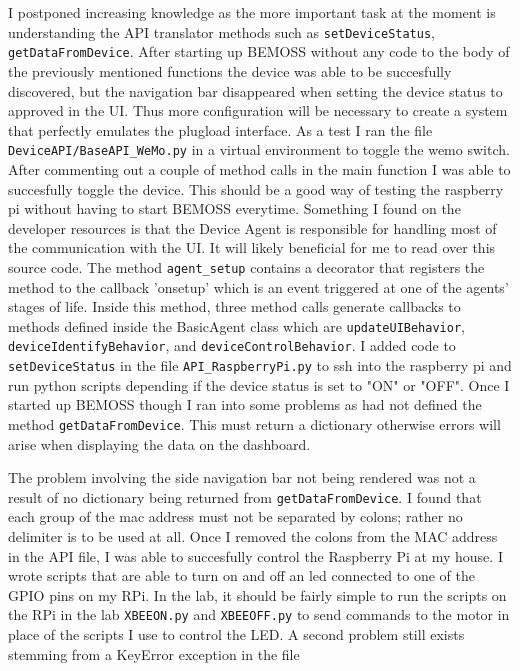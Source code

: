 \documentclass[fontsize=11pt, %
                             paper=letter, %
                             twoside, %
                             captions=tableheading,
                             index=totoc,
                             hyperref]{labbook}
\begin{document}
\begin{addmargin}[0cm]{0cm}
I postponed increasing knowledge as the more important task at the moment is understanding the API translator methods such as \texttt{setDeviceStatus}, \texttt{getDataFromDevice}. After starting up BEMOSS without any code to the body of the previously mentioned functions the device was able to be succesfully discovered, but the navigation bar disappeared when setting the device status to approved in the UI. Thus more configuration will be necessary to create a system that perfectly emulates the plugload interface.
\bigbreak\noindent
As a test I ran the file \texttt{DeviceAPI/BaseAPI\_WeMo.py} in a virtual environment to toggle the wemo switch. After commenting out a couple of method calls in the main function I was able to succesfully toggle the device. This should be a good way of testing the raspberry pi without having to start BEMOSS everytime.
\bigbreak\noindent
Something I found on the developer resources is that the Device Agent is responsible for handling most of the communication with the UI. It will likely beneficial for me to read over this source code. The method \texttt{agent\_setup} contains a decorator that registers the method to the callback 'onsetup' which is an event triggered at one of the agents' stages of life. Inside this method, three method calls generate callbacks to methods defined inside the BasicAgent class which are \texttt{updateUIBehavior}, \texttt{deviceIdentifyBehavior}, and \texttt{deviceControlBehavior}.
\bigbreak\noindent
I added code to \texttt{setDeviceStatus} in the file \texttt{API\_RaspberryPi.py} to ssh into the raspberry pi and run python scripts depending if the device status is set to "ON" or "OFF". Once I started up BEMOSS though I ran into some problems as had not defined the method \texttt{getDataFromDevice}. This must return a dictionary otherwise errors will arise when displaying the data on the dashboard.

The problem involving the side navigation bar not being rendered was not a result of no dictionary being returned from \texttt{getDataFromDevice}. I found that each group of the mac address must not be separated by colons; rather no delimiter is to be used at all. Once I removed the colons from the MAC address in the API file, I was able to succesfully control the Raspberry Pi at my house. I wrote scripts that are able to turn on and off an led connected to one of the GPIO pins on my RPi. In the lab, it should be fairly simple to run the scripts on the RPi in the lab \texttt{XBEEON.py} and \texttt{XBEEOFF.py} to send commands to the motor in place of the scripts I use to control the LED. 
\bigbreak\noindent
A second problem still exists stemming from a KeyError exception in the file 


\end{addmargin}
\end{document}
